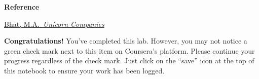 \documentclass[11pt]{article}
\begin{document}
    \textbf{Reference}

\href{https://www.kaggle.com/datasets/mysarahmadbhat/unicorn-companies}{Bhat,
M.A.~\emph{Unicorn Companies}}

    \textbf{Congratulations!} You've completed this lab. However, you may
not notice a green check mark next to this item on Coursera's platform.
Please continue your progress regardless of the check mark. Just click
on the ``save'' icon at the top of this notebook to ensure your work has
been logged.


    
    
    
\end{document}
